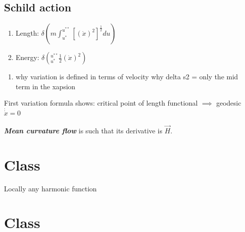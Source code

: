 \subsection{Schild action}

\begin{enumerate}
	\item Length: \(\delta\left(m \int_{u^*}^{u^{* *}}[(\dot x)^2]^{\frac{1}{2}}du\right) \)
	\item Energy: \(\delta\left(_{u^*}^{u^{* *}}\frac{1}{2}(\dot x)^2\right) \)
\end{enumerate}

\begin{question}\leavevmode
\begin{enumerate}
\item why variation is defined in terms of velocity
	why delta s2 = only the mid term in the xapsion
\end{enumerate}
\end{question}

\begin{remark}\leavevmode
First variation formula shows: critical point of length functional \(\implies\) geodesic  \(\dot \dot x=0\)
\end{remark}

\begin{defn}\leavevmode
\textit{\textbf{Mean curvature flow}} is such that its derivative is \(\vec{H}\).
\end{defn}

\section{Class}

\begin{claim}\leavevmode
Locally any harmonic function
\end{claim}

\section{Class}

